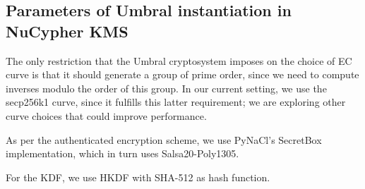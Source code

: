 \documentclass{amsart}
\begin{document}
\subsection{Parameters of Umbral instantiation in NuCypher KMS}
The only restriction that the Umbral cryptosystem imposes on the choice of EC curve is that it should generate a group of prime order, since we need to compute inverses modulo the order of this group. In our current setting, we use the secp256k1 curve, since it fulfills this latter requirement; we are exploring other curve choices that could improve performance. 

As per the authenticated encryption scheme, we use PyNaCl's SecretBox implementation, which in turn uses Salsa20-Poly1305.

For the KDF, we use HKDF with SHA-512 as hash function. 


\end{document}
